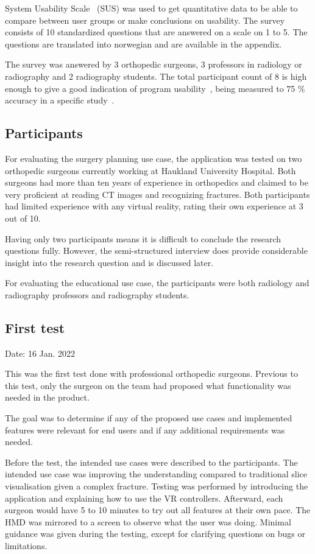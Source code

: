 \documentclass[a4paper]{report}
\begin{document}
System Usability Scale~\cite{system_usability_scale_sus_system_2013} (SUS) was used to get quantitative data to be able to compare between user groups or make conclusions on usability.
The survey consists of 10 standardized questions that are answered on a scale on 1 to 5. The questions are translated into norwegian and are available in the appendix.

The survey was answered by 3 orthopedic surgeons, 3 professors in radiology or radiography and 2 radiography students. The total participant count of 8 is high enough to give a good indication of program usability~\cite{experience}, being measured to 75 \% accuracy in a specific study~\cite{tullis}.


\subsection{Participants}

For evaluating the surgery planning use case, the application was tested on two orthopedic surgeons currently working at Haukland University Hospital.
Both surgeons had more than ten years of experience in orthopedics and claimed to be very proficient at reading CT images and recognizing fractures.
Both participants had limited experience with any virtual reality, rating their own experience at 3 out of 10.

Having only two participants means it is difficult to conclude the research questions fully. However, the semi-structured interview does provide considerable insight into the research question and is discussed later.

For evaluating the educational use case, the participants were both radiology and radiography professors and radiography students.

\subsection{First test}
Date: 16 Jan. 2022

This was the first test done with professional orthopedic surgeons. Previous to this test, only the surgeon on the team had proposed what functionality was needed in the product.

The goal was to determine if any of the proposed use cases and implemented features were relevant for end users and if any additional requirements was needed.

Before the test, the intended use cases were described to the participants. The intended use case was improving the understanding compared to traditional slice visualisation given a complex fracture.
Testing was performed by introducing the application and explaining how to use the VR controllers. Afterward, each surgeon would have 5 to 10 minutes to try out all features at their own pace. The HMD was mirrored to a screen to observe what the user was doing. Minimal guidance was given during the testing, except for clarifying questions on bugs or limitations.
\end{document}
